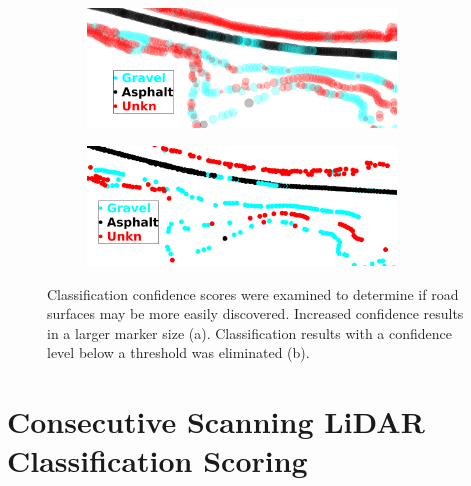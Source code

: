 \documentclass[numbered,pdftex]{ohio-etd}
\begin{document}
{{{		\begin{figure}[H]
			\centering
			\begin{subfigure}[b]{\textwidth}
				\centering
				\includegraphics[width=0.9\textwidth]{Defense_Images/range_db_4_conf_size_example}
				\caption{}
				\label{fig:range_db_4_conf_size_example}
			\end{subfigure}
			\vspace{1cm} %
			\begin{subfigure}[b]{\textwidth}
				\centering
				\includegraphics[width=0.9\textwidth]{Defense_Images/range_db_4_conf_trim_example}
				\caption{}
				\label{fig:range_db_4_conf_trim_example}
			\end{subfigure}
			\caption[]{Classification confidence scores were examined to determine if road surfaces may be more easily discovered. Increased confidence results in a larger marker size (a). Classification results with a confidence level below a threshold was eliminated (b).}
			\label{fig:conf_results}
		\end{figure}
		
	} %
	
	
	\section{Consecutive Scanning LiDAR Classification Scoring}\label{sec:consec_class_scoring}{
		
}}}
\end{document}
